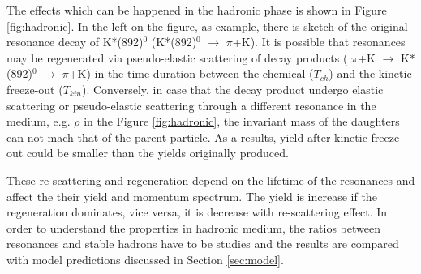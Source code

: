 The effects which can be happened in the hadronic phase is shown in Figure \ref{fig:hadronic}. In the left on the figure, as example, there is sketch of the original resonance decay of K*(892)$^{0}$ (K*(892)$^{0}$ $\rightarrow$ $\pi$+K). It is possible that resonances may be regenerated via pseudo-elastic scattering of decay products ( $\pi$+K $\rightarrow $ K*(892)$^{0}$ $\rightarrow$ $\pi$+K) in the time duration between the chemical ($T_{ch}$) and the kinetic freeze-out ($T_{kin}$).
Conversely, in case that the decay product undergo elastic scattering or pseudo-elastic scattering through a different resonance in the medium, e.g. $\rho$ in the Figure \ref{fig:hadronic}, the invariant mass of the daughters can not mach that of the parent particle. As a results, yield after kinetic freeze out could be smaller than the yields originally produced.

These re-scattering and regeneration depend on the lifetime of the resonances and affect the their yield and momentum spectrum. The yield is increase if the regeneration dominates, vice versa, it is decrease with re-scattering effect. In order to understand the properties in hadronic medium, the ratios between resonances and stable hadrons have to be studies and the results are compared with model predictions discussed in Section \ref{sec:model}.




\newpage